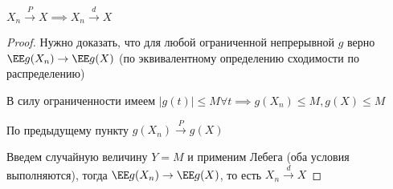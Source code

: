 \begin{corollary} 
$X_n \xrightarrow{P} X \implies X_n \xrightarrow{d} X$
\end{corollary} 

\begin{proof} 
Нужно доказать, что для любой ограниченной непрерывной $g$ верно $\EE g(X_n) \to \EE g(X)$ (по эквивалентному определению сходимости по распределению)

В силу ограниченности имеем $|g(t)| \leq M \forall t \implies g(X_n) \leq M, g(X) \leq M$

По предыдущему пункту $g(X_n) \xrightarrow{P} g(X)$

Введем случайную величину $Y = M$ и применим Лебега (оба условия выполняются), тогда $\EE g(X_n) \to \EE g(X)$, то есть
$X_n \xrightarrow{d} X$

\end{proof} 


